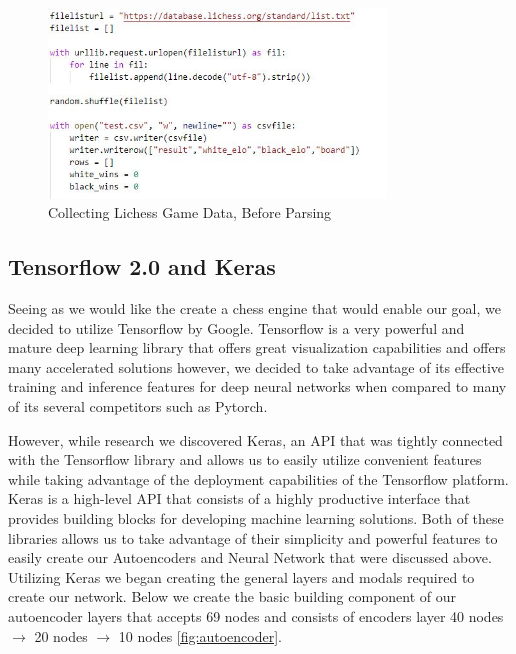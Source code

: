 \documentclass[12pt]{article}
\begin{document}
    \begin{singlespace}
        \begin{figure}[ht]
            \centering
            \caption{Collecting Lichess Game Data, Before Parsing}
            \label{fig:lichess-data-grab}
            \includegraphics[width=0.8\textwidth]{lichess-data-grab.jpg}
        \end{figure}
    \end{singlespace}

    \subsection{Tensorflow 2.0 and Keras}

    Seeing as we would like the create a chess engine that would enable our goal, we decided to utilize Tensorflow by Google. Tensorflow is a very powerful and mature deep learning library that offers great visualization capabilities and offers many accelerated solutions however, we decided to take advantage of its effective training and inference features for deep neural networks when compared to many of its several competitors such as Pytorch. 

    However, while research we discovered Keras, an API that was tightly connected with the Tensorflow library and allows us to easily utilize convenient features while taking advantage of the deployment capabilities of the Tensorflow platform. Keras is a high-level API that consists of a highly productive interface that provides building blocks for developing machine learning solutions. Both of these libraries allows us to take advantage of their simplicity and powerful features to easily create our Autoencoders and Neural Network that were discussed above. Utilizing Keras we began creating the general layers and modals required to create our network. Below we create the basic building component of our autoencoder layers that accepts 69 nodes and consists of encoders layer 40 nodes $\rightarrow$ 20 nodes $\rightarrow$ 10 nodes \ref{fig:autoencoder}.
\end{document}
